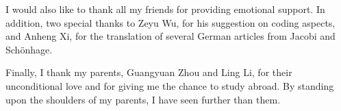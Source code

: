 \documentclass[12pt,a4paper, MSc,twoside]{muthesis_2020}
\begin{document}
I would also like to thank all my friends for providing emotional support. In addition, two special thanks to Zeyu Wu, for his suggestion on coding aspects, and Anheng Xi, for the translation of several German articles from Jacobi and Sch{\"o}nhage. 

Finally, I thank my parents, Guangyuan Zhou and Ling Li, for their unconditional love and for giving me the chance to study abroad. By standing upon the shoulders of my parents, I have seen further than them. 

\afterpreface


\pagestyle{fancy}













\appendix

\end{document}
